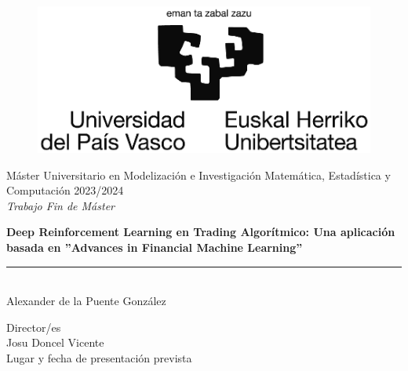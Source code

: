 \documentclass[a4paper,12pt, twoside]{report}
\begin{document}
\begin{titlepage}
\begin{sffamily}
\color{NavyBlue}
\begin{center}
\begin{figure}[htb]
\begin{center}
\vspace*{0.6cm}
\includegraphics[width=15cm]{figures/logoEHU_blanco_mediano.eps}
\vspace*{1.6cm}
\end{center}
\end{figure}
\begin{LARGE}
Máster Universitario en Modelización e Investigación Matemática, Estadística y Computación 
2023/2024 \\%
\vspace*{1cm}
\textsl{Trabajo Fin de Máster}\\
\end{LARGE}
\Huge{\textbf{Deep Reinforcement Learning en Trading Algorítmico: Una aplicación basada en ''Advances in Financial Machine Learning''}} %
\vspace*{1cm}
\rule{80mm}{0.1mm}\\
\huge{Alexander de la Puente González}\\ %
\vspace*{0.5cm}
\begin{Large}
Director/es\\
Josu Doncel Vicente\\
Lugar y fecha de presentación prevista\\
\end{Large}
\end{center}
\end{sffamily}
\end{titlepage}
\end{document}
